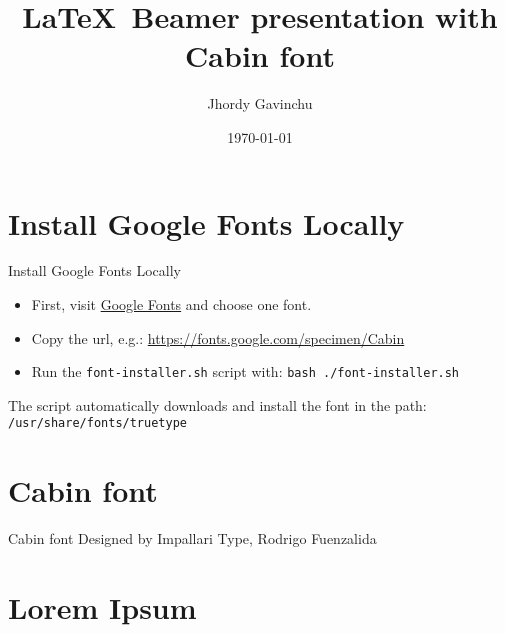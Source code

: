 \documentclass{beamer}
\title{\LaTeX\, Beamer presentation with Cabin font}
\author{Jhordy Gavinchu}
\institute{\href{https://jhordyess.com}{Jhordyess}}
\date{\today}
\begin{document}
\maketitle

\section{Install Google Fonts Locally}

\begin{frame}{Install Google Fonts Locally}
  \begin{itemize}
    \item First, visit \href{https://fonts.google.com/}{Google Fonts} and choose one font.
    \item Copy the url, e.g.: \href{https://fonts.google.com/specimen/Cabin}{https://fonts.google.com/specimen/Cabin}
    \item Run the \lstinline{font-installer.sh} script with: \lstinline{bash ./font-installer.sh}
  \end{itemize}
  The script automatically downloads and install the font in the path: \lstinline{/usr/share/fonts/truetype}
\end{frame}

\section{Cabin font}

\begin{frame}{Cabin font}
  Designed by Impallari Type, Rodrigo Fuenzalida
  \href{https://fonts.google.com/specimen/Cabin/tester}{}
\end{frame}

\section{Lorem Ipsum}
\end{document}
